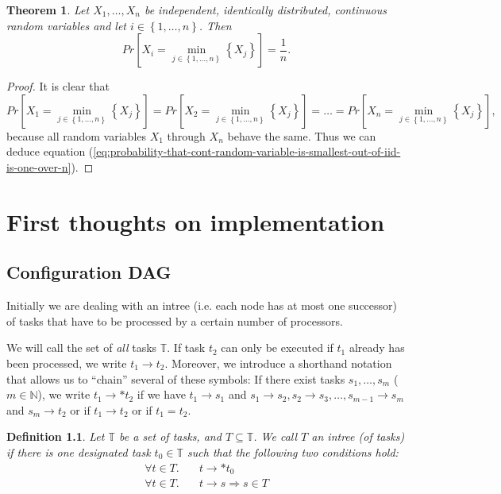 \documentclass[letter]{report}
\newtheorem{definition}{Definition}[chapter]
\newtheorem{theorem}{Theorem}[chapter]
\newcommand{\p}[1]{Pr\left[#1\right]}
\newcommand{\alltasks}{{\mathbb T}}
\newcommand{\neededfor}{\rightarrow}
\begin{document}
\begin{theorem}
  Let $X_1,\dots,X_n$ be independent, identically distributed, continuous random variables and let $i\in\left\{ 1,\dots,n \right\}$. Then 
  \begin{equation}
    \label{eq:probability-that-cont-random-variable-is-smallest-out-of-iid-is-one-over-n}
    \p{X_i = \min_{j\in\left\{ 1,\dots,n \right\}}\left\{ X_j \right\}} = \frac{1}{n}.
  \end{equation}
\end{theorem}

\begin{proof}
  It is clear that 
  \begin{equation*}
    \p{X_1 = \min_{j\in\left\{ 1,\dots,n \right\}}\left\{ X_j \right\}} = \p{X_2 = \min_{j\in\left\{ 1,\dots,n \right\}}\left\{ X_j \right\}} = \dots = \p{X_n = \min_{j\in\left\{ 1,\dots,n \right\}}\left\{ X_j \right\}},
  \end{equation*}
  because all random variables $X_1$ through $X_n$ behave the same. Thus we can deduce equation (\ref{eq:probability-that-cont-random-variable-is-smallest-out-of-iid-is-one-over-n}).
\end{proof}

\chapter{First thoughts on implementation}
\label{chap:first-thoughts-on-implementation}

\section{Configuration DAG}
\label{sec:configuration-dag}

Initially we are dealing with an intree (i.e. each node has at most one successor) of tasks that have to be processed by a certain number of processors.

We will call the set of \emph{all} tasks $\alltasks$. If task $t_2$ can only be executed if $t_1$ already has been processed, we write $t_1 \neededfor t_2$. Moreover, we introduce a shorthand notation that allows us to ``chain'' several of these symbols: If there exist tasks $s_1,\dots,s_m$ ($m\in\mathbb N$), we write $t_1 \neededfor* t_2$ if we have $t_1 \neededfor s_1$ and $s_1 \neededfor s_2, s_2 \neededfor s_3, \dots, s_{m-1} \neededfor s_m$ and $s_m \neededfor t_2$ or if $t_1\neededfor t_2$ or if $t_1=t_2$.

\begin{definition}
  Let $\alltasks$ be a set of tasks, and $T \subseteq \alltasks$. We call $T$ an intree (of tasks) if there is one designated task $t_0\in\alltasks$ such that the following two conditions hold:
  \begin{eqnarray*}
    \forall  t \in T. & \quad t \neededfor* t_0 \\
    \forall  t \in T. & \quad t\neededfor s \Rightarrow s\in T
  \end{eqnarray*}
\end{definition}
\end{document}
